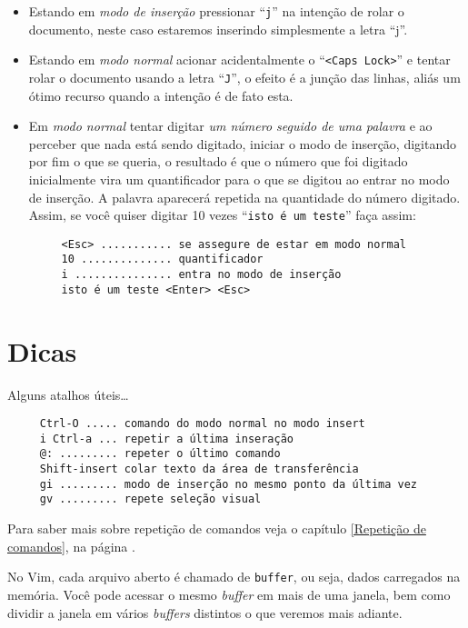 \begin{itemize}

\item Estando em {\em{modo de inserção}} pressionar ``\verb+j+'' na intenção
de rolar o documento, neste caso estaremos inserindo simplesmente a letra ``j''. 

\item Estando em {\em{modo normal}} acionar acidentalmente o ``\verb+<Caps Lock>+'' 
e tentar rolar o documento usando a letra ``\verb+J+'', o efeito é a
junção das linhas, aliás um ótimo recurso quando a intenção é de fato esta.

\item Em {\em{modo normal}} tentar digitar {\em{um número seguido de uma palavra}} e ao perceber que 
nada está sendo digitado, iniciar o modo de inserção, digitando por fim o que se queria, 
o resultado é que o número que foi digitado inicialmente vira um quantificador para o que 
se digitou ao entrar no modo de inserção. A palavra aparecerá repetida na quantidade do 
número digitado. Assim, se você quiser digitar 10 vezes ``\verb+isto é um teste+''
 faça assim:

\begin{verbatim}
     <Esc> ........... se assegure de estar em modo normal
     10 .............. quantificador
     i ............... entra no modo de inserção
     isto é um teste <Enter> <Esc>  
\end{verbatim}

\end{itemize}


\section{Dicas}
\label{Dicas}
Alguns atalhos úteis\dots
\begin{verbatim}
     Ctrl-O ..... comando do modo normal no modo insert
     i Ctrl-a ... repetir a última inseração
     @: ......... repeter o último comando
     Shift-insert colar texto da área de transferência
     gi ......... modo de inserção no mesmo ponto da última vez
     gv ......... repete seleção visual
\end{verbatim}

Para saber mais sobre repetição de comandos veja o capítulo \ref{Repetição de comandos},
na página \pageref{Repetição de comandos}.

No Vim, cada arquivo aberto é chamado de \verb|buffer|, ou seja, dados
carregados na memória. Você pode acessar o mesmo {\em buffer} em mais de uma
janela, bem como dividir a janela em vários {\em buffers} distintos o que veremos
mais adiante.


